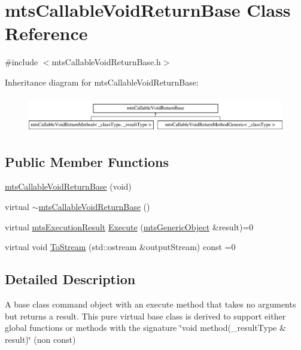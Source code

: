 \hypertarget{classmts_callable_void_return_base}{\section{mts\-Callable\-Void\-Return\-Base Class Reference}
\label{classmts_callable_void_return_base}
}


{\ttfamily \#include $<$mts\-Callable\-Void\-Return\-Base.\-h$>$}

Inheritance diagram for mts\-Callable\-Void\-Return\-Base\-:\begin{figure}[H]
\begin{center}
\leavevmode
\includegraphics[height=1.590909cm]{d9/ddd/classmts_callable_void_return_base}
\end{center}
\end{figure}
\subsection*{Public Member Functions}
\begin{DoxyCompactItemize}
\item 
\hyperlink{classmts_callable_void_return_base_ac353432b81aacb59a0fa3707fa15fcfc}{mts\-Callable\-Void\-Return\-Base} (void)
\item 
virtual \hyperlink{classmts_callable_void_return_base_a528fa7ce7713010f7c054d5a346bd802}{$\sim$mts\-Callable\-Void\-Return\-Base} ()
\item 
virtual \hyperlink{classmts_execution_result}{mts\-Execution\-Result} \hyperlink{classmts_callable_void_return_base_a7f0fe84a7078bad40663aa86cd455fc2}{Execute} (\hyperlink{classmts_generic_object}{mts\-Generic\-Object} \&result)=0
\item 
virtual void \hyperlink{classmts_callable_void_return_base_ab5c0d1c688e1996c31260e95525f8f6d}{To\-Stream} (std\-::ostream \&output\-Stream) const =0
\end{DoxyCompactItemize}


\subsection{Detailed Description}
A base class command object with an execute method that takes no arguments but returns a result. This pure virtual base class is derived to support either global functions or methods with the signature \char`\"{}void method(\-\_\-result\-Type \& result)\char`\"{} (non const) 

